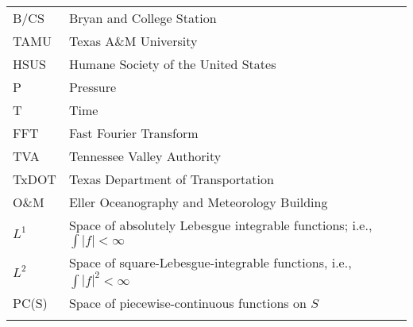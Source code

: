 \begin{spacing}{1.0}
	\begin{longtable}[htbp]{@{}p{} p{}@{}} 

	B/CS		&\hspace{-1.5in} Bryan and College Station\\	[2ex] %
	TAMU		&\hspace{-1.5in} Texas A\&M University\\	[2ex]
	HSUS        &\hspace{-1.5in} Humane Society of the United States\\ [2ex]
	P           &\hspace{-1.5in} Pressure\\ [2ex]
	T           &\hspace{-1.5in} Time\\ [2ex]
	FFT         &\hspace{-1.5in} Fast Fourier Transform\\ [2ex]
	TVA         &\hspace{-1.5in} Tennessee Valley Authority\\ [2ex]
	TxDOT       &\hspace{-1.5in} Texas Department of Transportation\\ [2ex]
	O\&M        &\hspace{-1.5in} Eller Oceanography and Meteorology Building\\ [2ex]
	$L^1$   &\hspace{-1.5in} Space of absolutely Lebesgue integrable functions; i.e., $\int |f| < \infty$\\ [2ex]
	$L^2$   &\hspace{-1.5in} Space of square-Lebesgue-integrable functions, i.e., $\int |f|^2 < \infty$\\ [2ex]
	PC(S) &\hspace{-1.5in} Space of piecewise-continuous functions on $S$\\ [2ex]
	
	\setcounter{table}{0}
	\end{longtable}
\end{spacing}


\pagebreak{}